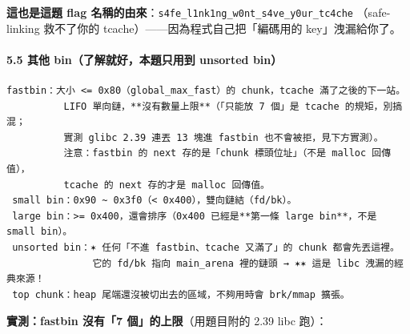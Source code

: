 \documentclass[10pt,a4paper]{article}
\begin{document}
\textbf{這也是這題 flag
名稱的由來}：\texttt{s4fe\_\allowbreak{}l1nk1ng\_\allowbreak{}w0nt\_\allowbreak{}s4ve\_\allowbreak{}y0ur\_\allowbreak{}tc4che}
（safe-linking 救不了你的 tcache）------因為程式自己把「編碼用的
key」洩漏給你了。

\paragraph{5.5 其他 bin（了解就好，本題只用到 unsorted
bin）}\label{ux5176ux4ed6-binux4e86ux89e3ux5c31ux597dux672cux984cux53eaux7528ux5230-unsorted-bin}

\begin{Verbatim}[breaklines=true,breakanywhere=true,breakautoindent=false,fontsize=\fontsize{7.0}{9.5}\selectfont]
 fastbin：大小 <= 0x80（global_max_fast）的 chunk，tcache 滿了之後的下一站。
          LIFO 單向鏈，**沒有數量上限**（「只能放 7 個」是 tcache 的規矩，別搞混；
          實測 glibc 2.39 連丟 13 塊進 fastbin 也不會被拒，見下方實測）。
          注意：fastbin 的 next 存的是「chunk 標頭位址」（不是 malloc 回傳值），
          tcache 的 next 存的才是 malloc 回傳值。
 small bin：0x90 ~ 0x3f0（< 0x400），雙向鏈結（fd/bk）。
 large bin：>= 0x400，還會排序（0x400 已經是**第一條 large bin**，不是 small bin）。
 unsorted bin：✶ 任何「不進 fastbin、tcache 又滿了」的 chunk 都會先丟這裡。
               它的 fd/bk 指向 main_arena 裡的鏈頭 → ✶✶ 這是 libc 洩漏的經典來源！
 top chunk：heap 尾端還沒被切出去的區域，不夠用時會 brk/mmap 擴張。
\end{Verbatim}

\textbf{實測：fastbin 沒有「7 個」的上限}（用題目附的 2.39 libc 跑）：
\end{document}
